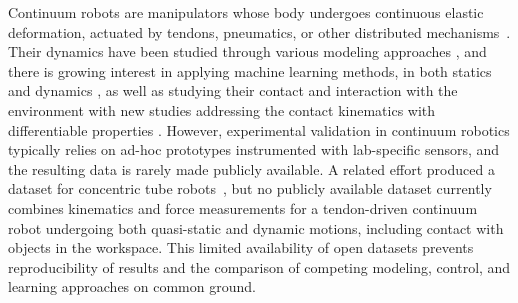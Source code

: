 \documentclass[14pt, a4paper]{article}
\begin{document}
Continuum robots are manipulators whose body undergoes continuous elastic deformation, actuated by tendons, pneumatics, or other distributed mechanisms~\cite{Robinson1999, BurgnerKahrs2015}.
Their dynamics have been studied through various modeling approaches \cite{Renda2016,Till2019, Boyer2021, Renda2024}, and there is growing interest in applying machine learning methods, in both statics \cite{Bensch2024} and dynamics \cite{Du2026}, as well as studying their contact and interaction with the environment \cite{Rao2024} with new studies addressing the contact kinematics with differentiable properties \cite{Mathew2026}.
%
However, experimental validation in continuum robotics typically relies on ad-hoc prototypes instrumented with lab-specific sensors, and the resulting data is rarely made publicly available.
A related effort produced a dataset for concentric tube robots~\cite{Grassmann2022}, but no publicly available dataset currently combines kinematics and force measurements for a tendon-driven continuum robot undergoing both quasi-static and dynamic motions, including contact with objects in the workspace.
%
This limited availability of open datasets prevents reproducibility of results and the comparison of competing modeling, control, and learning approaches on common ground.



\end{document}
